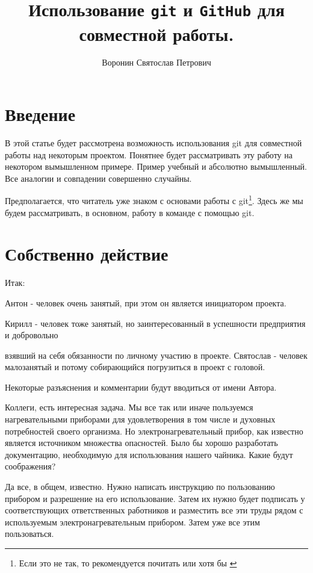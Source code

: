 \documentclass[14pt,a4paper]{article}
\author{Воронин Святослав Петрович}
\title{Использование \texttt{git} и \texttt{GitHub} для совместной работы.}
\begin{document}
\maketitle
\tableofcontents

\section{Введение}
В этой статье будет рассмотрена возможность использования git для совместной работы над 
некоторым проектом. Понятнее будет рассматривать эту работу на некотором вымышленном примере. 
Пример учебный и абсолютно вымышленный. Все аналогии и совпадении совершенно случайны.

Предполагается, что читатель уже знаком с основами работы с git\footnote{Если это не так, то 
рекомендуется почитать \cite{bib:chakon} или хотя бы \cite{bib:svyat-local-git}}. Здесь же мы
будем рассматривать, в основном, работу в команде с помощью git.

\section{Собственно действие}
Итак:


Антон - человек очень занятый, при этом он является инициатором проекта.\par
Кирилл - человек тоже занятый, но заинтересованный в успешности предприятия и добровольно\par
взявший на себя обязанности по личному участию в проекте.
Святослав - человек малозанятый и потому собирающийся погрузиться в проект с головой.\par
Некоторые разъяснения и комментарии будут вводиться от имени Автора.
\newpage


 Коллеги, есть интересная задача. Мы все так или иначе пользуемся нагревательными приборами
для удовлетворения в том числе и духовных потребностей своего организма. Но электронагревательный 
прибор, как известно является источником множества опасностей. Было бы хорошо разработать
документацию, необходимую для использования нашего чайника. Какие будут соображения?

 Да все, в общем, известно. Нужно написать инструкцию по пользованию прибором и разрешение
на его использование. 
Затем их нужно будет подписать у соответствующих ответственных работников и разместить все эти труды
рядом с используемым электронагревательным прибором. Затем уже все этим пользоваться. 
\end{document}
